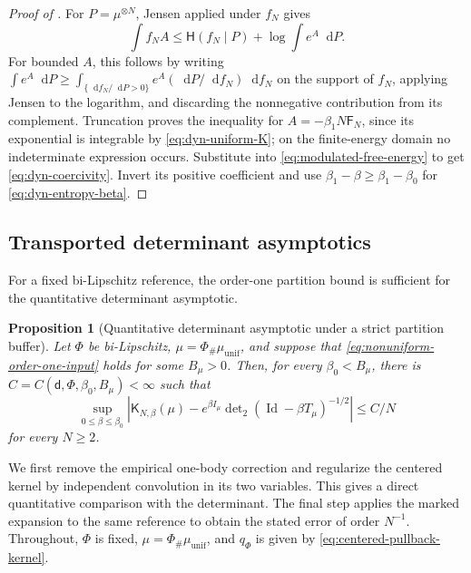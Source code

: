 \documentclass[11pt,reqno]{amsart}
\numberwithin{equation}{section}
\theoremstyle{plain}
\newtheorem{prop}[prop]{Proposition}
\theoremstyle{definition}
\renewcommand{\d}{\mathsf d}
\newcommand{\dd}{\mathop{}\!\mathrm d}
\newcommand{\Id}{\operatorname{Id}}
\newcommand{\be}{\beta}
\newcommand{\K}{\mathsf K}
\newcommand{\Fr}{\mathsf F}
\newcommand{\Hr}{\mathsf H}
\newcommand{\muunif}{\mu_{\mathrm{unif}}}
\begin{document}
\begin{proof}[Proof of ]
For $P=\mu^{\otimes N}$, Jensen applied under $f_N$ gives
\begin{equation}
 \int f_N A\leq\Hr(f_N\mid P)+\log\int e^A\dd P.
 \label{eq:dyn-entropy-duality}
\end{equation}
For bounded $A$, this follows by writing $\int e^A\dd P\geq\int_{\{\dd f_N/\dd P>0\}}e^A(\dd P/\dd f_N)\dd f_N$ on the support of $f_N$, applying Jensen to the logarithm, and discarding the nonnegative contribution from its complement. Truncation proves the inequality for $A=-\be_1N\Fr_N$, since its exponential is integrable by \eqref{eq:dyn-uniform-K}; on the finite-energy domain no indeterminate expression occurs. Substitute into \eqref{eq:modulated-free-energy} to get \eqref{eq:dyn-coercivity}. Invert its positive coefficient and use $\be_1-\be\geq\be_1-\be_0$ for \eqref{eq:dyn-entropy-beta}.
\end{proof}

\subsection{Transported determinant asymptotics}
\label{subsec:transported-determinants}

For a fixed bi-Lipschitz reference, the order-one partition bound is sufficient for the quantitative determinant asymptotic.

\begin{prop}[Quantitative determinant asymptotic under a strict partition buffer]
\label{prop:abstract-nonuniform-rate}
Let $\Phi$ be bi-Lipschitz, $\mu=\Phi_{\#}\muunif$, and suppose that \eqref{eq:nonuniform-order-one-input} holds for some $B_\mu>0$.
Then, for every $\be_0<B_{\mu}$, there is $C=C(\d,\Phi,\be_0,B_{\mu})<\infty$ such that
\begin{equation}
 \sup_{0\leq\be\leq\be_0}
 \left|\K_{N,\be}(\mu)
 -e^{\be I_{\mu}}
 \det\nolimits_2(\Id-\be T_{\mu})^{-1/2}\right|
 \leq C/N
 \label{eq:abstract-nonuniform-rate}
\end{equation}
for every $N\geq2$.
\end{prop}

We first remove the empirical one-body correction and regularize the centered kernel by independent convolution in its two variables. This gives a direct quantitative comparison with the determinant. The final step applies the marked expansion to the same reference to obtain the stated error of order $N^{-1}$. Throughout, $\Phi$ is fixed, $\mu=\Phi_\#\muunif$, and $q_\Phi$ is given by \eqref{eq:centered-pullback-kernel}.
\end{document}
